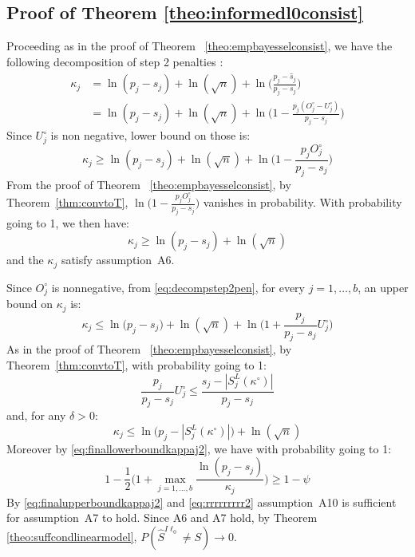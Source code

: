 \documentclass[aos]{imsart}
\theoremstyle{plain}
\begin{document}
\begin{supplement}
\subsection{Proof of Theorem \ref{theo:informedl0consist}}
Proceeding as in the proof of Theorem ~\ref{theo:empbayesselconsist}, we have the following decomposition of step 2 penalties :
\begin{align*}
    \kappa_j
    &= \ln(p_j-s_j) + \ln(\sqrt{n}) + \ln\Big(\frac{p_j-\widehat{s}_j}{p_j-s_j}\Big)  \nonumber\\
    &= \ln(p_j-s_j)+\ln(\sqrt{n})+\ln\Big(1-\frac{p_j(O^{\circ}_j-U^{\circ}_j)}{p_j-s_j}\Big)
\end{align*}
Since $U_j^{\circ}$ is non negative, lower bound on those is:
\begin{equation*}
    \kappa_j
    \geq  \ln(p_j-s_j)+\ln(\sqrt{n})+\ln\Big(1-\frac{p_j O^{\circ}_j}{p_j-s_j}\Big)
\end{equation*}
From the proof of Theorem ~\ref{theo:empbayesselconsist}, by Theorem~\ref{thm:convtoT}, $\ln\Big(1-\frac{p_j O^{\circ}_j}{p_j-s_j}\Big)$ vanishes in probability. With probability going to 1, we then have:
\begin{equation}\label{eq:finallowerboundkappaj2}\kappa_j 
    \geq  \ln(p_j-s_j)+\ln(\sqrt{n})
\end{equation}
and the $\kappa_j$ satisfy assumption~A6.

Since $O_j^{\circ}$ is nonnegative, from \eqref{eq:decompstep2pen}, for every $j=1,\ldots,b$, an upper bound on $\kappa_j$ is:
\begin{equation*}
    \kappa_j \leq \ln\big(p_j-s_j\big)+\ln(\sqrt{n})+\ln\bigg(1+\frac{p_j}{p_j-s_j}U^{\circ}_j\bigg)
\end{equation*}
As in the proof of Theorem ~\ref{theo:empbayesselconsist}, by Theorem~\ref{thm:convtoT}, with probability going to 1:
\begin{equation*}
    \frac{p_j}{p_j-s_j}U^{\circ}_j \leq \frac{s_j-|S^L_j(\kappa^{\circ})|}{p_j-s_j}
\end{equation*}
and, for any $\delta >0$:
\begin{equation}\label{eq:finalupperboundkappaj2}
\kappa_j \leq \ln\big(p_j-|S^L_j(\kappa^{\circ})|\big)+\ln(\sqrt{n})
\end{equation}
Moreover by \eqref{eq:finallowerboundkappaj2}, we have with probability going to 1:
\begin{equation}\label{eq:rrrrrrrrr2}
    1-\frac12\Big(1+\max_{j=1, \ldots,b}\frac{\ln(p_j-s_j)}{\kappa_j}\Big) \geq 1-\psi
\end{equation}
By \eqref{eq:finalupperboundkappaj2} and \eqref{eq:rrrrrrrrr2} assumption~A10 is sufficient for assumption~A7 to hold. Since A6 and A7 hold, by Theorem \ref{theo:suffcondlinearmodel}, $P(\hat{S}^{I\ell_0}\neq S) \to 0$.


\end{supplement}
\end{document}
